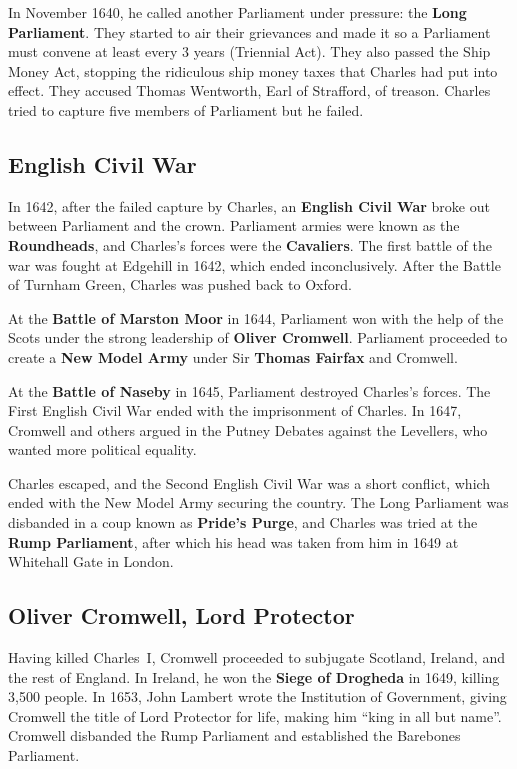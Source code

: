 In November 1640, he called another Parliament under pressure: the \textbf{Long Parliament}.
They started to air their grievances
and made it so a Parliament must convene at least every 3 years (Triennial Act).
They also passed the Ship Money Act,
stopping the ridiculous ship money taxes that Charles had put into effect.
They accused Thomas Wentworth, Earl of Strafford, of treason.
Charles tried to capture five members of Parliament but he failed.

\subsection*{English Civil War}

In 1642, after the failed capture by Charles,
an \textbf{English Civil War} broke out between Parliament and the crown.
Parliament armies were known as the \textbf{Roundheads},
and Charles's forces were the \textbf{Cavaliers}.
The first battle of the war was fought at Edgehill in 1642, which ended inconclusively.
After the Battle of Turnham Green, Charles was pushed back to Oxford.

At the \textbf{Battle of Marston Moor} in 1644,
Parliament won with the help of the Scots under the strong leadership of \textbf{Oliver Cromwell}.
Parliament proceeded to create a \textbf{New Model Army}
under Sir \textbf{Thomas Fairfax} and Cromwell.

At the \textbf{Battle of Naseby} in 1645, Parliament destroyed Charles's forces.
The First English Civil War ended with the imprisonment of Charles.
In 1647, Cromwell and others argued in the Putney Debates against the Levellers,
who wanted more political equality.

Charles escaped, and the Second English Civil War was a short conflict,
which ended with the New Model Army securing the country.
The Long Parliament was disbanded in a coup known as \textbf{Pride's Purge},
and Charles was tried at the \textbf{Rump Parliament},
after which his head was taken from him in 1649 at Whitehall Gate in London.

\subsection*{Oliver Cromwell, Lord Protector}

Having killed Charles~I, Cromwell proceeded to subjugate Scotland, Ireland, and the rest of England.
In Ireland, he won the \textbf{Siege of Drogheda} in 1649, killing 3,500 people.
In 1653, John Lambert wrote the Institution of Government,
giving Cromwell the title of Lord Protector for life,
making him ``king in all but name''.
Cromwell disbanded the Rump Parliament and established the Barebones Parliament.


